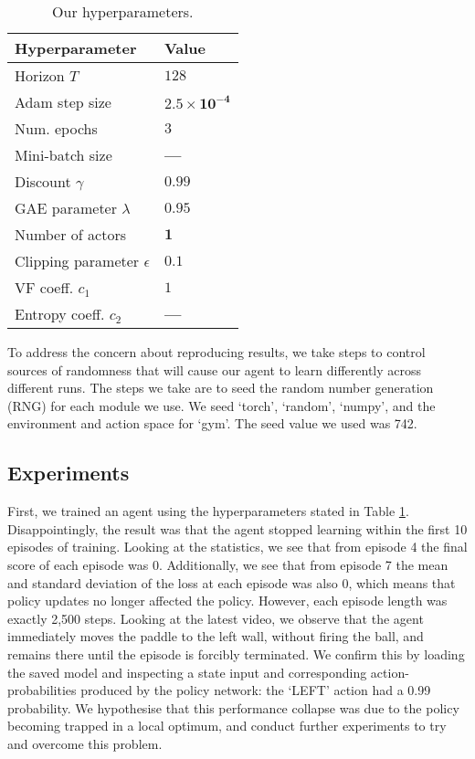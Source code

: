 \documentclass[12pt,a4paper]{article}
\begin{document}
\begin{table}[ht]
\begin{subtable}[ht]{0.45\textwidth}
    \end{subtable}
    \hfill
    \begin{subtable}[ht]{0.45\textwidth}
        \centering
        \caption{Our hyperparameters.}
        \label{tab:our-param}
        \begin{tabular}{ l|l } 
            Hyperparameter                & Value \\
            \hline 
            Horizon $T$                   & $128$ \\ 
            Adam step size                 & $\mathbf{2.5 \times 10^{-4}}$ \\
            Num. epochs                   & $3$ \\
            Mini-batch size                & \textbf{---} \\
            Discount $\gamma$           & $0.99$ \\
            GAE parameter $\lambda$     & $0.95$ \\
            Number of actors              & $\mathbf{1}$ \\
            Clipping parameter $\epsilon$ & $\mathbf{0.1}$ \\
            VF coeff. $c_1$               & $1$ \\
            Entropy coeff. $c_2$          & \textbf{---}
        \end{tabular}
     \end{subtable}
\end{table}

To address the concern about reproducing results, we take steps to control sources of randomness that will cause our agent to learn differently across different runs. The steps we take are to seed the random number generation (RNG) for each module we use. We seed `torch', `random', `numpy', and the environment and action space for `gym'. The seed value we used was 742.

\subsection{Experiments}
First, we trained an agent using the hyperparameters stated in Table \ref{tab:our-param}. Disappointingly, the result was that the agent stopped learning within the first 10 episodes of training. Looking at the statistics, we see that from episode 4 the final score of each episode was 0. Additionally, we see that from episode 7 the mean and standard deviation of the loss at each episode was also 0, which means that policy updates no longer affected the policy. However, each episode length was exactly 2,500 steps. Looking at the latest video, we observe that the agent immediately moves the paddle to the left wall, without firing the ball, and remains there until the episode is forcibly terminated. We confirm this by loading the saved model and inspecting a state input and corresponding action-probabilities produced by the policy network: the `LEFT' action had a 0.99 probability. We hypothesise that this performance collapse was due to the policy becoming trapped in a local optimum, and conduct further experiments to try and overcome this problem. 
\end{document}
